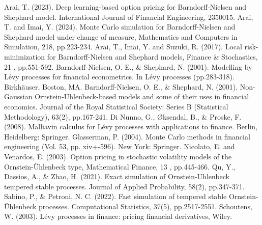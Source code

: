 \begin{thebibliography}{9999}
 Arai, T. (2023). Deep learning-based option pricing for Barndorff-Nielsen and Shephard model.
International Journal of Financial Engineering, 2350015.
 Arai, T. and Imai, Y. (2024). Monte Carlo simulation for Barndorff-Nielsen and Shephard model under change of measure,
Mathematics and Computers in Simulation, 218, pp.223-234.
 Arai, T., Imai, Y. and Suzuki, R. (2017). Local risk-minimization for Barndorff-Nielsen and Shephard models,
Finance \& Stochastics, 21 , pp.551-592.
 Barndorff-Nielsen, O. E., \& Shephard, N. (2001).
Modelling by L\'evy processes for financial econometrics. In L\'evy processes (pp.283-318). Birkh\"auser, Boston, MA.
 Barndorff-Nielsen, O. E., \& Shephard, N. (2001).
Non-Gaussian Ornstein-Uhlenbeck-based models and some of their uses in financial economics.
Journal of the Royal Statistical Society: Series B (Statistical Methodology), 63(2), pp.167-241.
 Di Nunno, G., {\O}ksendal, B., \& Proske, F. (2008).
Malliavin calculus for L\'evy processes with applications to finance. Berlin, Heidelberg: Springer.
 Glasserman, P. (2004). Monte Carlo methods in financial engineering (Vol. 53, pp. xiv+-596). New York: Springer.
 Nicolato, E. and Venardos, E. (2003). Option pricing in stochastic volatility models of the Ornstein-\"Uhlenbeck type,
Mathematical Finance, 13 , pp.445-466.
 Qu, Y., Dassios, A., \& Zhao, H. (2021). Exact simulation of Ornstein-Uhlenbeck tempered stable processes.
Journal of Applied Probability, 58(2), pp.347-371.
 Sabino, P., \& Petroni, N. C. (2022).
Fast simulation of tempered stable Ornstein-\"Uhlenbeck processes. Computational Statistics, 37(5), pp.2517-2551.
 Schoutens, W. (2003). L\'evy processes in finance: pricing financial derivatives, Wiley.
\end{thebibliography}
